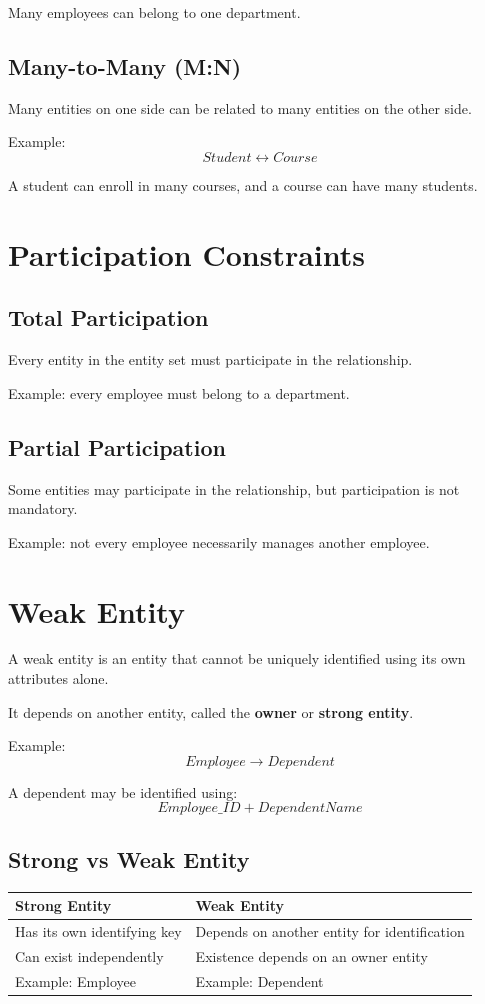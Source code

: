 \documentclass[12pt,a4paper]{article}
\begin{document}
Many employees can belong to one department.

\subsection{Many-to-Many (M:N)}
Many entities on one side can be related to many entities on the other side.

Example:
\[
Student \longleftrightarrow Course
\]

A student can enroll in many courses, and a course can have many students.

\section{Participation Constraints}

\subsection{Total Participation}
Every entity in the entity set must participate in the relationship.

Example: every employee must belong to a department.

\subsection{Partial Participation}
Some entities may participate in the relationship, but participation is not mandatory.

Example: not every employee necessarily manages another employee.

\section{Weak Entity}

A weak entity is an entity that cannot be uniquely identified using its own attributes alone.

It depends on another entity, called the \textbf{owner} or \textbf{strong entity}.

Example:
\[
Employee \longrightarrow Dependent
\]

A dependent may be identified using:
\[
Employee\_ID + DependentName
\]

\subsection{Strong vs Weak Entity}

\begin{center}
\begin{tabular}{p{} p{}}
\toprule
\textbf{Strong Entity} & \textbf{Weak Entity}\\
\midrule
Has its own identifying key & Depends on another entity for identification\\
Can exist independently & Existence depends on an owner entity\\
Example: Employee & Example: Dependent\\
\bottomrule
\end{tabular}
\end{center}
\end{document}

